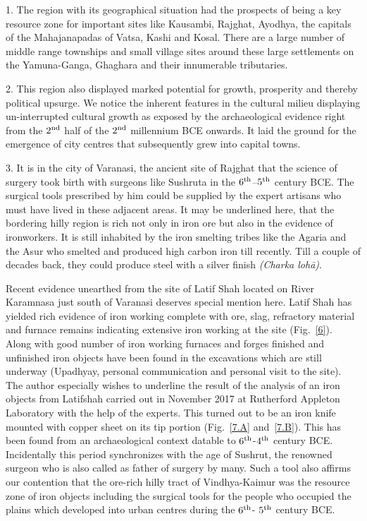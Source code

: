 1. The region with its geographical situation had the prospects of being a key resource zone for important sites like Kausambi, Rajghat, Ayodhya, the capitals of the Mahajanapadas of Vatsa, Kashi and Kosal. There are a large number of middle range townships and small village sites around these large settlements on the Yamuna-Ganga, Ghaghara and their innumerable tributaries.

2. This region also displayed marked potential for growth, prosperity and thereby political upsurge. We notice the inherent features in the cultural milieu displaying un-interrupted cultural growth as exposed by the archaeological evidence right from the $2^{\rm nd}$ half of the $2^{\rm nd}$ millennium BCE onwards. It laid the ground for the emergence of city centres that subsequently grew into capital towns.

3. It is in the city of Varanasi, the ancient site of Rajghat that the science of surgery took birth with surgeons like Sushruta in the $6^{\rm th}$–$5^{\rm th}$ century BCE. The surgical tools prescribed by him could be supplied by the expert artisans who must have lived in these adjacent areas. It may be underlined here, that the bordering hilly region is rich not only in iron ore but also in the evidence of ironworkers. It is still inhabited by the iron smelting tribes like the Agaria and the Asur who smelted and produced high carbon iron till recently. Till a couple of decades back, they could produce steel with a silver finish \textit{(Charka lohā)}.

Recent evidence unearthed from the site of Latif Shah located on River Karamnasa just south of Varanasi deserves special mention here. Latif Shah has yielded rich evidence of iron working complete with ore, slag, refractory material and furnace remains indicating extensive iron working at the site (Fig.~\ref{6}). Along with good number of iron working furnaces and forges finished and unfinished iron objects have been found in the excavations which are still underway (Upadhyay, personal communication and personal visit to the site). The author especially wishes to underline the result of the analysis of an iron objects from Latifshah carried out in November 2017 at Rutherford Appleton Laboratory with the help of the experts. This turned out to be an iron knife mounted with copper sheet on its tip portion (Fig.~\ref{7.A} and~\ref{7.B}). This has been found from an archaeological context datable to $6^{\rm th}$-$4^{\rm th}$ century BCE. Incidentally this period synchronizes with the age of Sushrut, the renowned surgeon who is also called as father of surgery by many. Such a tool also affirms our contention that the ore-rich hilly tract of Vindhya-Kaimur was the resource zone of iron objects including the surgical tools for the people who occupied the plains which developed into urban centres during the $6^{\rm th}$- $5^{\rm th}$ century BCE.


